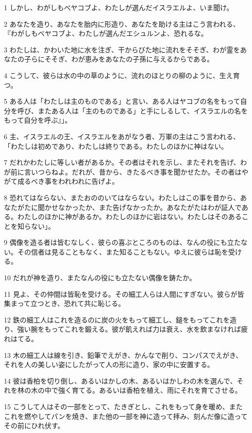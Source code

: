 \par 1 しかし、わがしもべヤコブよ、わたしが選んだイスラエルよ、いま聞け。
\par 2 あなたを造り、あなたを胎内に形造り、あなたを助ける主はこう言われる、『わがしもべヤコブよ、わたしが選んだエシュルンよ、恐れるな。
\par 3 わたしは、かわいた地に水を注ぎ、干からびた地に流れをそそぎ、わが霊をあなたの子らにそそぎ、わが恵みをあなたの子孫に与えるからである。
\par 4 こうして、彼らは水の中の草のように、流れのほとりの柳のように、生え育つ。
\par 5 ある人は「わたしは主のものである」と言い、ある人はヤコブの名をもって自分を呼び、またある人は「主のものである」と手にしるして、イスラエルの名をもって自分を呼ぶ』」。
\par 6 主、イスラエルの王、イスラエルをあがなう者、万軍の主はこう言われる、「わたしは初めであり、わたしは終りである。わたしのほかに神はない。
\par 7 だれかわたしに等しい者があるか。その者はそれを示し、またそれを告げ、わが前に言いつらねよ。だれが、昔から、きたるべき事を聞かせたか。その者はやがて成るべき事をわれわれに告げよ。
\par 8 恐れてはならない、またおののいてはならない。わたしはこの事を昔から、あなたがたに聞かせなかったか、また告げなかったか。あなたがたはわが証人である。わたしのほかに神があるか。わたしのほかに岩はない。わたしはそのあることを知らない」。
\par 9 偶像を造る者は皆むなしく、彼らの喜ぶところのものは、なんの役にも立たない。その信者は見ることもなく、また知ることもない。ゆえに彼らは恥を受ける。
\par 10 だれが神を造り、またなんの役にも立たない偶像を鋳たか。
\par 11 見よ、その仲間は皆恥を受ける。その細工人らは人間にすぎない。彼らが皆集まって立つとき、恐れて共に恥じる。
\par 12 鉄の細工人はこれを造るのに炭の火をもって細工し、鎚をもってこれを造り、強い腕をもってこれを鍛える。彼が飢えれば力は衰え、水を飲まなければ疲れはてる。
\par 13 木の細工人は線を引き、鉛筆でえがき、かんなで削り、コンパスでえがき、それを人の美しい姿にしたがって人の形に造り、家の中に安置する。
\par 14 彼は香柏を切り倒し、あるいはかしの木、あるいはかしわの木を選んで、それを林の木の中で強く育てる。あるいは香柏を植え、雨にそれを育てさせる。
\par 15 こうして人はその一部をとって、たきぎとし、これをもって身を暖め、またこれを燃やしてパンを焼き、また他の一部を神に造って拝み、刻んだ像に造ってその前にひれ伏す。
